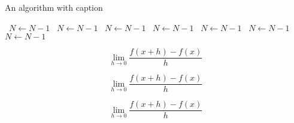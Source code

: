 \documentclass[a4paper]{article}
\begin{document}
\begin{algorithm}
\caption{An algorithm with caption}
\begin{algorithmic}
\    \State $N \gets N - 1$
\    \State $N \gets N - 1$
\    \State $N \gets N - 1$
\    \State $N \gets N - 1$
\    \State $N \gets N - 1$
\    \State $N \gets N - 1$
\    \State $N \gets N - 1$
\EndWhile
\end{algorithmic}
\end{algorithm}

\[\lim_{h \rightarrow 0 } \frac{f(x+h)-f(x)}{h}\]

\[\lim_{h \rightarrow 0 } \frac{f(x+h)-f(x)}{h}\]

\[\lim_{h \rightarrow 0 } \frac{f(x+h)-f(x)}{h}\]
\end{document}
